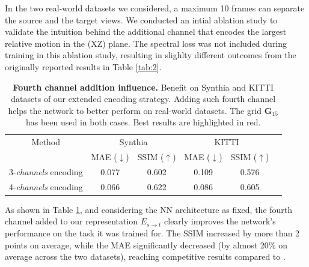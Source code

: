 In the two real-world datasets we considered, a maximum 10 frames can separate the source and the target views. We conducted an intial ablation study to validate the intuition behind the additional channel that encodes the largest relative motion in the (XZ) plane. The spectral loss was not included during training in this ablation study, resulting in slighlty different outcomes from the originally reported results in Table \ref{tab:2}. 

\begin{table}[h!]
    \caption{\textbf{Fourth channel addition influence.} Benefit on Synthia \citep{ros2016synthia} and KITTI \citep{geiger2012we} datasets of our extended encoding strategy. Adding such fourth channel helps the network to better perform on real-world datasets. The grid $\textbf{G}_{15}$ has been used in both cases. Best results are highlighted in \colorbox{red!25}{red}. }
    \label{tab:compExtended}
    \begin{center}%
    \begin{adjustbox}{width =.8\linewidth}
    \begin{tabular}[h]{c||ccccc}
    \hline
      Method & \multicolumn{2}{c}{Synthia} & \multicolumn{2}{c}{KITTI} \\
      &  MAE ($\downarrow$) & SSIM ($\uparrow$) & MAE ($\downarrow$) & SSIM ($\uparrow$) \\
    \hline
    3-\textit{channels} encoding & 0.077 & 0.602 & 0.109 & 0.576  \\
    4-\textit{channels} encoding & \cellcolor{red!25}0.066 & \cellcolor{red!25}0.622 & \cellcolor{red!25}0.086 & \cellcolor{red!25}0.605 \\
    \hline 
    \end{tabular}
    \end{adjustbox}
    \end{center}
    \end{table}

As shown in Table \ref{tab:compExtended}, and considering the \ac{NN} architecture as fixed, the fourth channel added to our representation $E_{s\xrightarrow{}t}$ clearly improves the network's performance on the task it was trained for. The \ac{SSIM} increased by more than 2 points on average, while the \ac{MAE} significantly decreased (by almost 20\% on average across the two datasets), reaching competitive results compared to \citep{kim2020novel}. 


